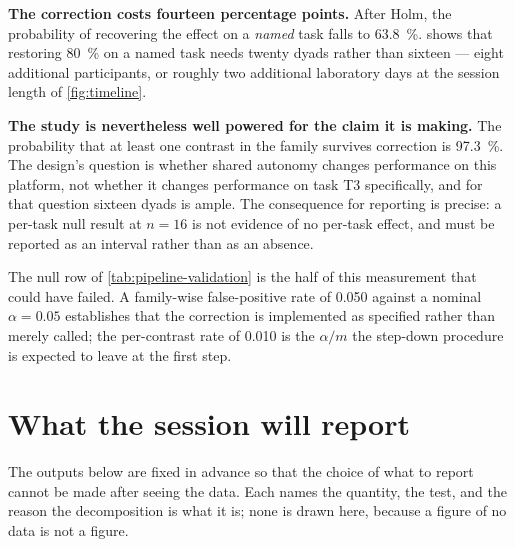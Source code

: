 \textbf{The correction costs fourteen percentage points.} After Holm, the
probability of recovering the effect on a \emph{named} task falls to
\SI{63.8}{\percent}.  shows that restoring
\SI{80}{\percent} on a named task needs twenty dyads rather than sixteen ---
eight additional participants, or roughly two additional laboratory days at
the session length of \cref{fig:timeline}.

\textbf{The study is nevertheless well powered for the claim it is making.}
The probability that at least one contrast in the family survives correction
is \SI{97.3}{\percent}. The design's question is whether shared autonomy
changes performance on this platform, not whether it changes performance on
task T3 specifically, and for that question sixteen dyads is ample. The
consequence for reporting is precise: a per-task null result at $n = 16$ is
not evidence of no per-task effect, and must be reported as an interval rather
than as an absence.

The null row of \cref{tab:pipeline-validation} is the half of this measurement
that could have failed. A family-wise false-positive rate of \num{0.050}
against a nominal $\alpha = \num{0.05}$ establishes that the correction is
implemented as specified rather than merely called; the per-contrast rate of
\num{0.010} is the $\alpha/m$ the step-down procedure is expected to leave at
the first step.

\section{What the session will report}
\label{sec:reporting-plan}

The outputs below are fixed in advance so that the choice of what to report
cannot be made after seeing the data. Each names the quantity, the test, and
the reason the decomposition is what it is; none is drawn here, because a
figure of no data is not a figure.

